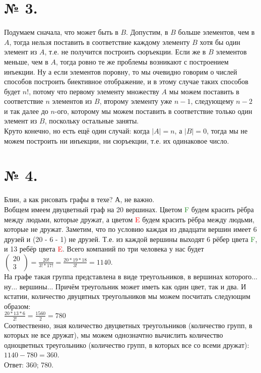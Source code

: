 \documentclass[a4paper,11pt]{report}
\begin{document}
\section{№ 3.}
Подумаем сначала, что может быть в $B$. Допустим, в $B$ больше элементов, чем в $A$,
тогда нельзя поставить в соответствие каждому элементу $B$ хотя бы один элемент из $A$,
т.е. не получится построить сюръекции. Если же в $B$ элементов меньше, чем в $A$, тогда
ровно те же проблемы возникают с построением инъекции. Ну а если элементов поровну, то 
мы очевидно говорим о числей способов построить биективное отображение, и в этому случае 
таких способов будет $n!$, потому что первому элементу множеству $A$ мы можем поставить 
в соответствие $n$ элементов из $B$, второму элементу уже $n - 1$, следующему $n - 2$ и так 
далее до $n$-ого, которому мы можем поставить в соответствие только один элемент из $B$, 
поскольку остальные заняты.\\
Круто конечно, но есть ещё один случай: когда $|A| = n$, а $|B| = 0$, тогда мы не можем 
построить ни инъекции, ни сюръекции, т.е. их одинаковое число.\\
\section{№ 4.}
Блин, а как рисовать графы в техе? А, не важно.\\
Вобщем имеем двуцветный граф на 20 вершинах. Цветом \textcolor{ForestGreen}{F} будем
красить рёбра между людьми, которые дружат, а цветом \textcolor{red}{E} будем 
красить рёбра между людьми, которые не дружат. Заметим, что по условию
каждая из двадцати вершин имеет 6 друзей и (20 - 6 - 1) не друзей.
Т.е. из каждой вершины выходят 6 рёбер цвета \textcolor{ForestGreen}{F}, и 13 ребёр
цвета \textcolor{red}{E}. Всего компаний по три человека у нас будет $
\begin{pmatrix}
20\\
3
\end{pmatrix}
= \frac{20!}{3! * 17!} = \frac{20 * 19 * 18}{3!} = 1140
$.\\
На графе такая группа представлена в виде треугольников, в вершинах которого... ну... вершины...
Причём треугольник
может иметь как один цвет, так и два. И кстатии, количество двуцвтных треугольников
мы можем посчитать следующим образом:\\
$\frac{20 * 13 * 6}{2!} = \frac{1560}{2} = 780$\\
Соотвественно, зная количество двуцветных треугольников (количество групп, в которых
не все дружат), мы можем однозначтно вычислить количество одноцветных треугольнико 
(количество групп, в которых все со всеми дружат):\\
$1140 - 780 = 360$.\\
Ответ: 360; 780.
\end{document}
